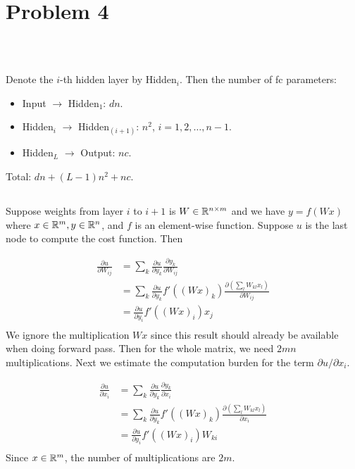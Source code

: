\section{Problem 4}~\label{sec:prob4}

\subsection{} %

Denote the $i$-th hidden layer by Hidden$_{i}$.
Then the number of fc parameters:

\begin{itemize}
    \item Input $\to$ Hidden$_{1}$: $dn$.
    \item Hidden$_{i}$ $\to$ Hidden$_{(i+1)}$: $n^2$, $i=1,2,\dots,n-1$.
    \item Hidden$_{L}$ $\to$ Output: $nc$.
\end{itemize}

Total: $dn + (L-1)n^2 + nc$.

\subsection{} %

Suppose weights from layer $i$ to $i+1$ is $W\in{\mathbb{R}}^{n\times m}$
and we have $y=f(Wx)$
where $x\in{\mathbb{R}}^m, y\in{\mathbb{R}}^n$, and $f$ is an element-wise function.
Suppose $u$ is the last node to compute the cost function.
Then

\begin{equation}
\begin{split}
    \frac{\partial u}{\partial W_{ij}}
        &= \sum_k \frac{\partial u}{\partial y_k}\frac{\partial y_k}{\partial W_{ij}} \\
        &= \sum_{k} \frac{\partial u}{\partial y_k} f'((Wx)_k) \frac{\partial (\sum_l W_{kl}x_{l})}{\partial W_{ij}} \\
        &= \frac{\partial u}{\partial y_i} f'((Wx)_i) x_j \\
\end{split}
\end{equation}
We ignore the multiplication $Wx$ since this result should already be available
when doing forward pass.
Then for the whole matrix,
we need $2mn$ multiplications.
Next we estimate the computation burden for the term
$\partial u/\partial x_i$.

\begin{equation}
\begin{split}
    \frac{\partial u}{\partial x_i}
        &= \sum_k \frac{\partial u}{\partial y_k}\frac{\partial y_k}{\partial x_i} \\
        &= \sum_{k} \frac{\partial u}{\partial y_k} f'((Wx)_k) \frac{\partial (\sum_l W_{kl}x_{l})}{\partial x_i} \\
        &= \frac{\partial u}{\partial y_i} f'((Wx)_i) W_{ki} \\
\end{split}
\end{equation}
Since $x\in{\mathbb{R}}^m$,
the number of multiplications are $2m$.

